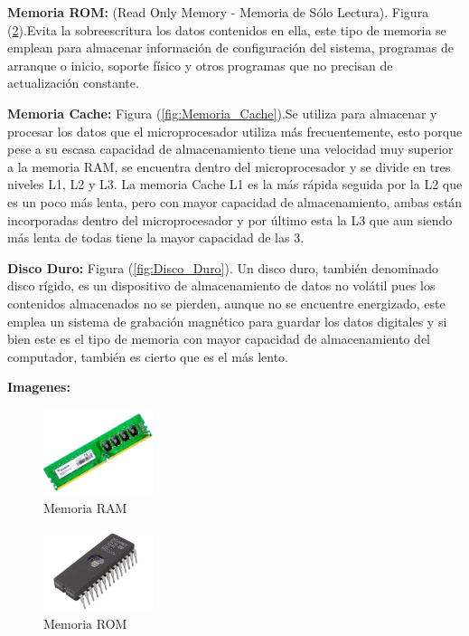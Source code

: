 \documentclass{article}
\begin{document}
\textbf{Memoria ROM:} (Read Only Memory - Memoria de Sólo Lectura). Figura (\ref{fig:Memoria_ROM}).Evita la sobreescritura los datos contenidos en ella, este tipo de memoria se emplean para almacenar información de configuración del sistema, programas de arranque o inicio, soporte físico y otros programas que no precisan de actualización constante.\cite{Definición ABC}

\vspace{0.5cm}

\textbf{Memoria Cache:} Figura  (\ref{fig:Memoria_Cache}).Se utiliza para almacenar y procesar los datos que el microprocesador utiliza más frecuentemente, esto porque pese a su escasa capacidad de almacenamiento tiene una velocidad muy superior a la memoria RAM, se encuentra dentro del microprocesador y se divide en tres niveles L1, L2 y L3. La memoria Cache L1 es la más rápida seguida por la L2 que es un poco más lenta, pero con mayor capacidad de almacenamiento, ambas están incorporadas dentro del microprocesador y por último esta la L3 que aun siendo más lenta de todas tiene la mayor capacidad de las 3.

\vspace{0.5cm}

\textbf{Disco Duro:} Figura (\ref{fig:Disco_Duro}). Un disco duro, también denominado disco rígido, es un dispositivo de almacenamiento de datos no volátil pues los contenidos almacenados no se pierden, aunque no se encuentre energizado, este emplea un sistema de grabación magnético para guardar los datos digitales y si bien este es el tipo de memoria con mayor capacidad de almacenamiento del computador, también es cierto que es el más lento.

\vspace{0.5cm}

\textbf{Imagenes:}

\begin{figure}[h]
\includegraphics[width=3.2cm]{Memoria_RAM.jpg}
\centering
\caption{Memoria RAM}
\label{fig:Memoria_RAM}
\end{figure}

\begin{figure}[h]
\includegraphics[width=3.2cm]{Memoria_ROM.jpg}
\centering
\caption{Memoria ROM}
\label{fig:Memoria_ROM}
\end{figure}
\end{document}
